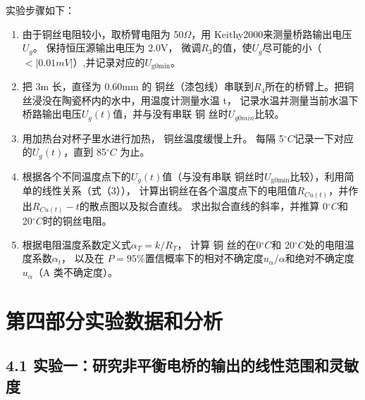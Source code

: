 \documentclass{ctexart}
\begin{document}
实验步骤如下：
\begin{enumerate}[(1)]
    \item 由于铜丝电阻较小，取桥臂电阻为 50$\Omega$，用 Keithy2000来测量桥路输出电压$U_g$。 保持恒压源输出电压为 2.0V， 微调$R_3$的值，使$U_g$尽可能的小（$<\left\lvert 0.01 mV \right\rvert $）,并记录对应的$U_\text{g0min}$。
    \item 把 3m 长，直径为 0.60mm 的 铜丝（漆包线）串联到$R_4$所在的桥臂上。把铜丝浸没在陶瓷杯内的水中，用温度计测量水温 t， 记录水温并测量当前水温下桥路输出电压$U_g(t)$值，并与没有串联 铜 丝时$U_{g0min}$比较。
    \item 用加热台对杯子里水进行加热， 铜丝温度缓慢上升。 每隔 5$^\circ C$记录一下对应的$U_g(t)$，直到 85$^\circ C$ 为止。
    \item 根据各个不同温度点下的$U_g(t)$值（与没有串联 铜丝时$U_\text{g0min}$比较），利用简单的线性关系（式（3））， 计算出铜丝在各个温度点下的电阻值$R_{Cu(t)}$，并作出$R_{Cu(t)}-t$的散点图以及拟合直线。 求出拟合直线的斜率，并推算 0$^\circ C$和 20$^\circ C$时的铜丝电阻。
    \item  根据电阻温度系数定义式$\alpha_T=k/R_T$， 计算 铜 丝的在0$^\circ C$和 20$^\circ C$处的电阻温度系数$\alpha_t$， 以及在 $P = 95\%$置信概率下的相对不确定度$u_\alpha/\alpha$和绝对不确定度$u_\alpha$（A 类不确定度）。
   
\end{enumerate}
    \section*{第四部分\quad 实验数据和分析}
    \subsection*{4.1 \quad 实验一：研究非平衡电桥的输出的线性范围和灵敏度}
\end{document}

